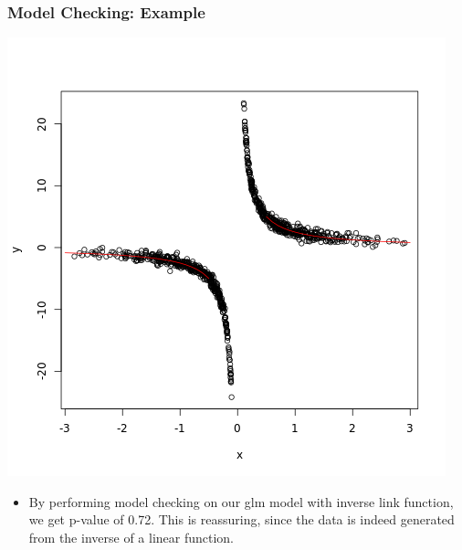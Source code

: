 \begin{frame}
\frametitle{Model Checking: Example}
\includegraphics[height=.5\textheight]{glm/Unknown3}
\begin{itemize}
\item By performing model checking on our glm model with inverse link function, we get p-value of 0.72. This is reassuring, since the data is indeed generated from the inverse of a linear function.
\end{itemize}
\end{frame}

